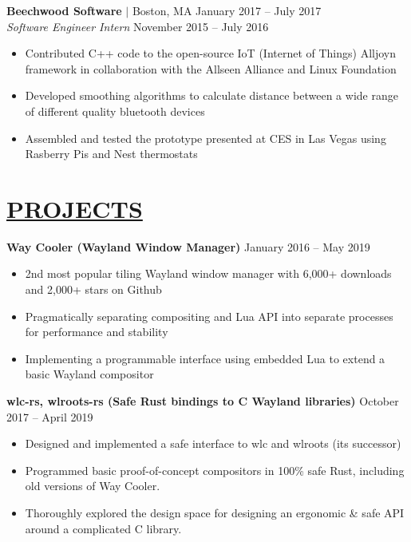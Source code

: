 \documentclass[overlapped,line]{res}
\begin{document}
\begin{resume}
\textbf{Beechwood Software} $|$ Boston, MA \hfill January 2017 \--- July 2017\\
{\sl Software Engineer Intern} \hfill November 2015 \--- July 2016
\begin{itemize}  \itemsep -2pt
	\item Contributed C++ code to the open-source IoT (Internet of Things) Alljoyn framework in collaboration with the Allseen Alliance and Linux Foundation
	\item Developed smoothing algorithms to calculate distance between a wide range of different quality bluetooth devices
	\item Assembled and tested the prototype presented at CES in Las Vegas using Rasberry Pis and Nest thermostats
\end{itemize}
\noindent\makebox[7.15in]{\rule{7.15in}{0.4pt}}


\section{\underline{PROJECTS}}
\textbf{Way Cooler (Wayland Window Manager)} \hfill January 2016 \--- May 2019
\begin{itemize}  \itemsep -2pt
	\item 2nd most popular tiling Wayland window manager with 6,000+ downloads and 2,000+ stars on Github
	\item Pragmatically separating compositing and Lua API into separate
      processes for performance and stability
	\item Implementing a programmable interface using embedded Lua to extend
      a basic Wayland compositor
\end{itemize}
\textbf{wlc-rs, wlroots-rs (Safe Rust bindings to C Wayland libraries)} \hfill October 2017 \--- April 2019
\begin{itemize} \itemsep -2pt
  \item Designed and implemented a safe interface to wlc and wlroots (its successor)
  \item Programmed basic proof-of-concept compositors in 100\% safe Rust,
    including old versions of Way Cooler.
    \item Thoroughly explored the design space for designing an ergonomic \&
      safe API around a complicated C library.
\end{itemize}


\end{resume}
\end{document}
